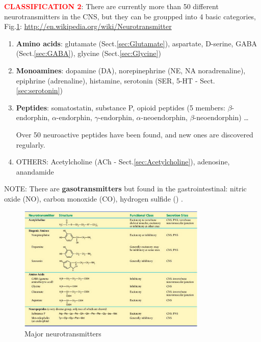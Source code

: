 \textcolor{red}{\bf CLASSIFICATION 2}: There are currently more than 50
different neurotransmitters in the CNS, but they can be groupped into 4 basic
categories, Fig.\ref{fig:neurotransmitters}:
\url{http://en.wikipedia.org/wiki/Neurotransmitter}
\begin{enumerate}
  \label{sec:neurotransmitter-amino-acids}
  \item {\bf Amino acids}: glutamate (Sect.\ref{sec:Glutamate}), aspartate,
  D-serine, GABA (Sect.\ref{sec:GABA}), glycine (Sect.\ref{sec:Glycine})
  
  \label{sec:neurotransmitter-monoamines}
  \item {\bf Monoamines}: dopamine (DA), norepinephrine (NE, NA noradrenaline),
  epiphrine (adrenaline), histamine, serotonin (SER, 5-HT - Sect.\ref{sec:serotonin}) 
  
  \label{sec:neurotransmitter-peptide}
  \item {\bf Peptides}: somatostatin, substance P, opioid peptides
  (5 members: $\beta$-endorphin, $\alpha$-endorphin, $\gamma$-endorphin,
  $\alpha$-neoendorphin, $\beta$-neoendorphin)  \ldots

Over 50 neuroactive peptides have been found, and new ones are discovered
regularly.
  
  \item OTHERS: Acetylcholine (ACh - Sect.\ref{sec:Acetylcholine}), adenosine, anandamide
\end{enumerate}
NOTE: There are {\bf gasotransmitters} but found in the gastrointestinal: nitric
oxide (NO), carbon monoxide (CO), hydrogen sulfide ()
\citep{kasparek2008}.   

\begin{figure}[hbt]
  \centerline{\includegraphics[height=6cm,
    angle=0]{./images/neurotransmitters.eps}}
  \caption{Major neurotransmitters}
  \label{fig:neurotransmitters}
\end{figure}


